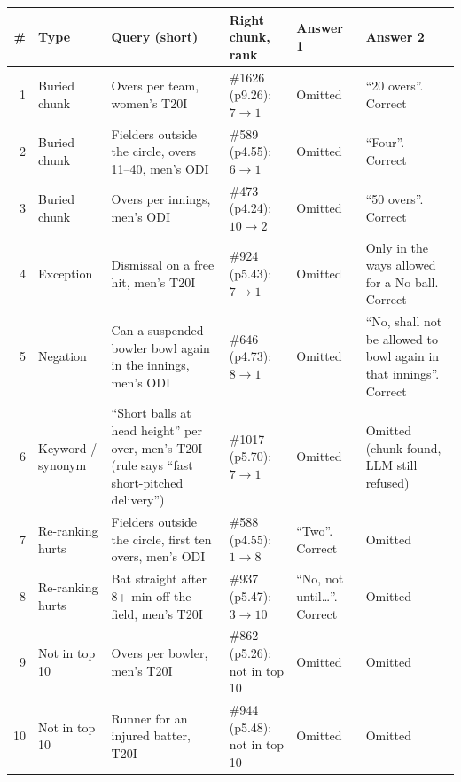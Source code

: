 \documentclass[10pt,a4paper]{article}
\renewcommand{\arraystretch}{1.15}
\begin{document}
{\small\renewcommand{\arraystretch}{1.0}
\begin{longtable}{@{}r >{\raggedright}p{1.8cm} >{\raggedright}p{4.2cm} >{\raggedright}p{3.0cm} >{\raggedright}p{2.0cm} >{\raggedright\arraybackslash}p{3.2cm}@{}}
\toprule
\# & Type & Query (short) & Right chunk, rank & Answer 1 & Answer 2 \\
\midrule
\endhead
1 & Buried chunk & Overs per team, women's T20I & \#1626 (p9.26): $7\rightarrow1$ & Omitted & ``20 overs''. Correct \\
2 & Buried chunk & Fielders outside the circle, overs 11--40, men's ODI & \#589 (p4.55): $6\rightarrow1$ & Omitted & ``Four''. Correct \\
3 & Buried chunk & Overs per innings, men's ODI & \#473 (p4.24): $10\rightarrow2$ & Omitted & ``50 overs''. Correct \\
4 & Exception & Dismissal on a free hit, men's T20I & \#924 (p5.43): $7\rightarrow1$ & Omitted & Only in the ways allowed for a No ball. Correct \\
5 & Negation & Can a suspended bowler bowl again in the innings, men's ODI & \#646 (p4.73): $8\rightarrow1$ & Omitted & ``No, shall not be allowed to bowl again in that innings''. Correct \\
6 & Keyword / synonym & ``Short balls at head height'' per over, men's T20I (rule says ``fast short-pitched delivery'') & \#1017 (p5.70): $7\rightarrow1$ & Omitted & Omitted (chunk found, LLM still refused) \\
7 & Re-ranking hurts & Fielders outside the circle, first ten overs, men's ODI & \#588 (p4.55): $1\rightarrow8$ & ``Two''. Correct & Omitted \\
8 & Re-ranking hurts & Bat straight after 8+ min off the field, men's T20I & \#937 (p5.47): $3\rightarrow10$ & ``No, not until\dots''. Correct & Omitted \\
9 & Not in top 10 & Overs per bowler, men's T20I & \#862 (p5.26): not in top 10 & Omitted & Omitted \\
10 & Not in top 10 & Runner for an injured batter, T20I & \#944 (p5.48): not in top 10 & Omitted & Omitted \\
\bottomrule
\end{longtable}}
\end{document}
